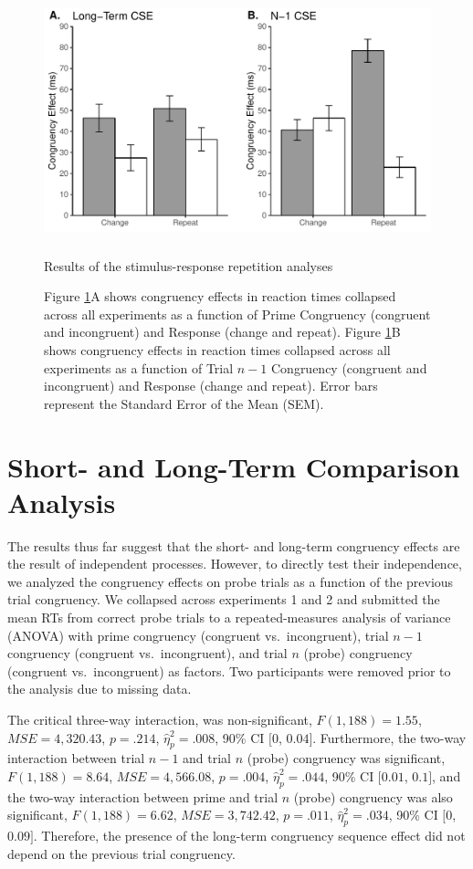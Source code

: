 \documentclass[]{DissertateCUNY}
\begin{document}
\begin{figure}
  \centering
  \includegraphics[height=2.75in]{figures/MGfigure5.pdf}
  \caption{Results of the stimulus-response repetition analyses}
  \caption*{Figure \ref{MG_figure5}A shows congruency effects in reaction times collapsed across all experiments as a function of Prime Congruency (congruent and incongruent) and Response (change and repeat). Figure \ref{MG_figure5}B shows congruency effects in reaction times collapsed across all experiments as a function of Trial $n-1$ Congruency (congruent and incongruent) and Response (change and repeat). Error bars represent the Standard Error of the Mean (SEM).}

  \label{MG_figure5}
\end{figure}

\hypertarget{short--and-long-term-comparison-analysis}{%
\section{Short- and Long-Term Comparison
Analysis}\label{short--and-long-term-comparison-analysis}}

The results thus far suggest that the short- and long-term congruency
effects are the result of independent processes. However, to directly
test their independence, we analyzed the congruency effects on probe
trials as a function of the previous trial congruency. We collapsed
across experiments 1 and 2 and submitted the mean RTs from correct probe
trials to a repeated-measures analysis of variance (ANOVA) with prime
congruency (congruent vs.~incongruent), trial \(n-1\) congruency
(congruent vs.~incongruent), and trial \(n\) (probe) congruency
(congruent vs.~incongruent) as factors. Two participants were removed
prior to the analysis due to missing data.

The critical three-way interaction, was non-significant,
\(F(1, 188) = 1.55\), \(\mathit{MSE} = 4,320.43\), \(p = .214\),
\(\hat{\eta}^2_p = .008\), 90\% CI \([0\), \(0.04]\). Furthermore, the
two-way interaction between trial \(n-1\) and trial \(n\) (probe)
congruency was significant, \(F(1, 188) = 8.64\),
\(\mathit{MSE} = 4,566.08\), \(p = .004\), \(\hat{\eta}^2_p = .044\),
90\% CI \([0.01\), \(0.1]\), and the two-way interaction between prime
and trial \(n\) (probe) congruency was also significant,
\(F(1, 188) = 6.62\), \(\mathit{MSE} = 3,742.42\), \(p = .011\),
\(\hat{\eta}^2_p = .034\), 90\% CI \([0\), \(0.09]\). Therefore, the
presence of the long-term congruency sequence effect did not depend on
the previous trial congruency.
\end{document}
